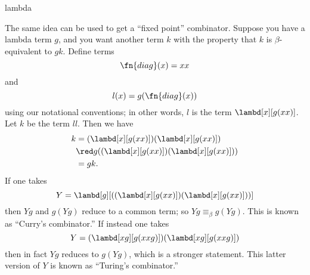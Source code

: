 \documentclass[../../../include/open-logic-section]{subfiles}
\begin{document}
\begin{tagblock}{lambda}
\begin{digress}
The same idea can be used to get a ``fixed point'' combinator. Suppose
you have a lambda term $g$, and you want another term $k$ with the
property that $k$ is $\beta$-equivalent to $gk$. Define terms
\[
\fn{diag}(x) = xx
\]
and
\[
l(x) = g(\fn{diag}(x))
\]
using our notational conventions; in other words, $l$ is the term
$\lambd[x][g(xx)]$. Let $k$ be the term $ll$. Then we have
\begin{align*}
k & = (\lambd[x][g(xx)])(\lambd[x][g(xx)]) \\
& \red  g((\lambd[x][g(xx)])(\lambd[x][g(xx)])) \\
& = gk.
\end{align*}
If one takes
\[
Y = \lambd[g][((\lambd[x][g(xx)])(\lambd[x][g(xx)]))]
\]
then $Yg$ and $g(Yg)$ reduce to a common term; so $Yg \equiv_\beta
g(Yg)$. This is known as ``Curry's combinator.'' If instead one takes
\[
Y = (\lambd[xg][g(xxg)])(\lambd[xg][g(xxg)])
\]
then in fact $Yg$ reduces to $g(Yg)$, which is a stronger statement.
This latter version of $Y$ is known as ``Turing's combinator.''
\end{digress}
\end{tagblock}
\end{document}
